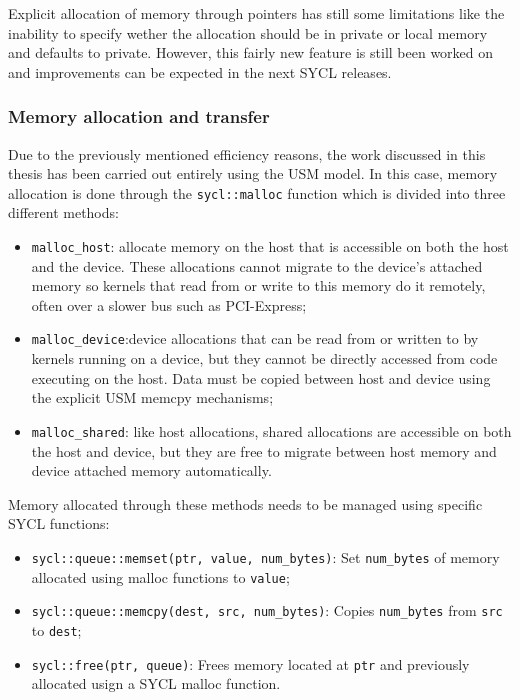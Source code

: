Explicit allocation of memory through pointers has still some limitations like the inability to specify wether the allocation should be in private or local memory and defaults to private. However, this fairly new feature is still been worked on and improvements can be expected in the next SYCL releases.

\subsubsection{Memory allocation and transfer}
Due to the previously mentioned efficiency reasons, the work discussed in this thesis has been carried out entirely using the USM model. In this case, memory allocation is done through the \Verb "sycl::malloc" function which is divided into three different methods:

\begin{itemize}
    \item \Verb "malloc_host": allocate memory on the host that is accessible on both the host and the device. These allocations cannot migrate to the device’s attached memory so kernels that read from or write to this memory do it remotely, often over a slower bus such as PCI-Express;
    \item \Verb "malloc_device":device allocations that can be read from or written to by kernels running on a device, but they cannot be directly accessed from code executing on the host. Data must be copied between host and device using the explicit USM memcpy mechanisms;
    \item \Verb "malloc_shared": like host allocations, shared allocations are accessible on both the host and device, but they are free to migrate between host memory and device attached memory automatically.
\end{itemize}

Memory allocated through these methods needs to be managed using specific SYCL functions:

\begin{itemize}
    \item \protect\Verb "sycl::queue::memset(ptr, value, num_bytes)": Set \Verb "num_bytes" of memory allocated using malloc functions to \Verb "value";
    \item \protect\Verb "sycl::queue::memcpy(dest, src, num_bytes)": Copies \Verb "num_bytes" from \Verb "src" to \Verb "dest";
    \item \protect\Verb "sycl::free(ptr, queue)": Frees memory located at \Verb "ptr" and previously allocated usign a SYCL malloc function.
\end{itemize}

